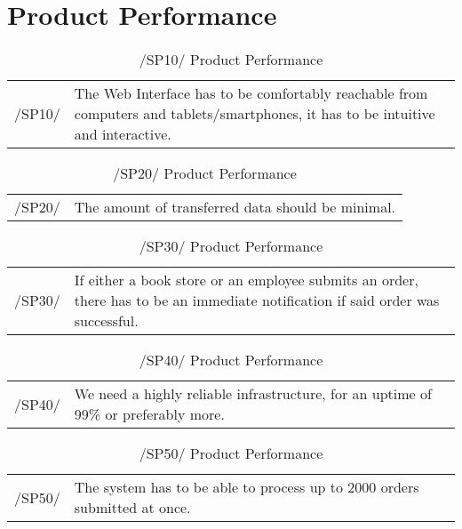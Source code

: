 \documentclass[11pt,a4paper,oneside,svgnames]{report}
\begin{document}
\chapter{Product Performance}

\begin{table}[H]
\centering
\begin{tabular}{p{1.5cm}p{11cm}}
\cellcolor{white}/SP10/ & The Web Interface has to be comfortably reachable from computers and tablets/smartphones, it has to be intuitive and interactive.\\
\end{tabular}
\caption{/SP10/ Product Performance}
\end{table}

\begin{table}[H]
\centering
\begin{tabular}{p{1.5cm}p{11cm}}
\cellcolor{white}/SP20/ & The amount of transferred data should be minimal. \\
\end{tabular}
\caption{/SP20/ Product Performance}
\end{table}

\begin{table}[H]
\centering
\begin{tabular}{p{1.5cm}p{11cm}}
\cellcolor{white}/SP30/ & If either a book store or an employee submits an order, there has to be an immediate notification if said order was successful.\\
\end{tabular}
\caption{/SP30/ Product Performance}
\end{table}

\begin{table}[H]
\centering
\begin{tabular}{p{1.5cm}p{11cm}}
\cellcolor{white}/SP40/ & We need a highly reliable infrastructure, for an uptime of 99\% or preferably more. \\
\end{tabular}
\caption{/SP40/ Product Performance}
\end{table}

\begin{table}[H]
\centering
\begin{tabular}{p{1.5cm}p{11cm}}
\cellcolor{white}/SP50/ & The system has to be able to process up to 2000 orders submitted at once. \\
\end{tabular}
\caption{/SP50/ Product Performance}
\end{table}
\end{document}
